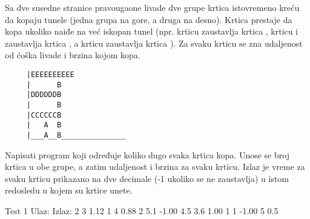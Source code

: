 \begin{Exercise}[label=515]
  Sa dve susedne stranice pravougaone livade dve grupe krtica
  istovremeno kreću da kopaju tunele (jedna grupa na gore, a druga na
  desno). Krtica prestaje da kopa ukoliko naiđe na već iskopan tunel
  (npr. krticu  zaustavlja krtica , krticu  i
   zaustavlja krtica , a krticu  zaustavlja
  krtica ). Za svaku krticu se zna udaljenost od ćoška livade
  i brzina kojom kopa.
\begin{verbatim}
     |EEEEEEEEEE
     |      B
     |DDDDDDB 
     |      B
     |CCCCCCB
     |   A  B
     |___A__B_______________
\end{verbatim}
Napisati program koji određuje koliko dugo svaka krtica kopa. Unose
se broj krtica u obe grupe, a zatim udaljenost i brzina za svaku
krticu. Izlaz je vreme za svaku krticu prikazano na dve decimale (-1
ukoliko se ne zaustavlja) u istom redosledu u kojem su krtice unete.


\begin{miditest}
\begin{test}{Test 1}
Ulaz:          Izlaz:
2 3            1.12
1   4          0.88
2   5.1        -1.00
4.5 3.6        1.00
1   1          -1.00
5   0.5
\end{test}
\end{miditest}
  
\end{Exercise}

